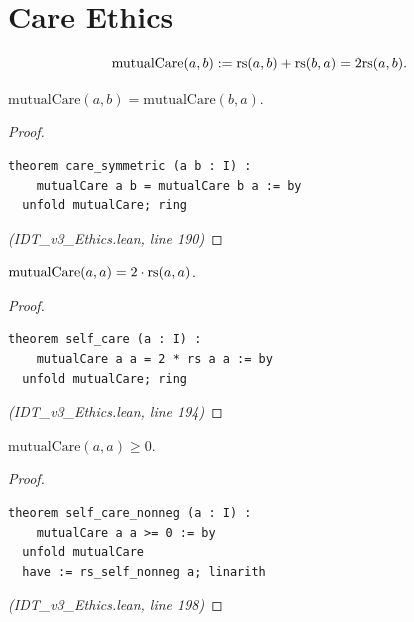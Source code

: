 \section{Care Ethics}
\label{sec:care-ethics}

\begin{definition}
\label{def:mutual-care}
\[
  \mathrm{mutualCare}(a, b) := \mathrm{rs}(a, b) + \mathrm{rs}(b, a) = 2\mathrm{rs}(a, b).
\]
\end{definition}

\begin{theorem}
\label{thm:care-symmetric}
$\mathrm{mutualCare}(a, b) = \mathrm{mutualCare}(b, a)$.
\end{theorem}

\begin{proof}
\begin{lstlisting}
theorem care_symmetric (a b : I) :
    mutualCare a b = mutualCare b a := by
  unfold mutualCare; ring
\end{lstlisting}
\textit{(IDT\_v3\_Ethics.lean, line 190)}
\end{proof}

\begin{theorem}
\label{thm:self-care}
$\mathrm{mutualCare}(a, a) = 2 \cdot \mathrm{rs}(a, a)$.
\end{theorem}

\begin{proof}
\begin{lstlisting}
theorem self_care (a : I) :
    mutualCare a a = 2 * rs a a := by
  unfold mutualCare; ring
\end{lstlisting}
\textit{(IDT\_v3\_Ethics.lean, line 194)}
\end{proof}

\begin{theorem}
\label{thm:self-care-nonneg}
$\mathrm{mutualCare}(a, a) \geq 0$.
\end{theorem}

\begin{proof}
\begin{lstlisting}
theorem self_care_nonneg (a : I) :
    mutualCare a a >= 0 := by
  unfold mutualCare
  have := rs_self_nonneg a; linarith
\end{lstlisting}
\textit{(IDT\_v3\_Ethics.lean, line 198)}
\end{proof}

